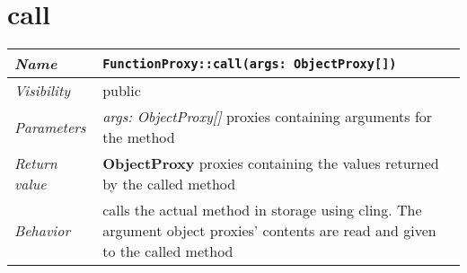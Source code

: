 \section{call}
\begin{longtable}{p{3cm} @{\hskip 1cm} p{12cm}}
	\hline

	\textit{Name} & \texttt{FunctionProxy::call(args: ObjectProxy[])}\\
	\hline

	\textit{Visibility} & public\\
	\hline

	\textit{Parameters} & \textit{args: ObjectProxy[]} proxies containing arguments for the  method\\
	\hline

	\textit{Return value} & \textbf{ObjectProxy} proxies containing the values returned by the called method\\
	\hline

	\textit{Behavior} & calls the actual method in storage using cling.
			The argument object proxies' contents are read and given to the called method  \\
	\hline

\end{longtable} \pagebreak

